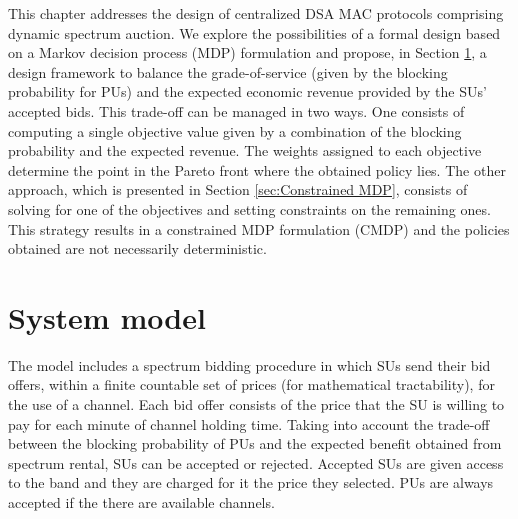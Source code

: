 This chapter addresses the design of centralized DSA MAC protocols comprising dynamic spectrum auction. We explore the possibilities of a formal design based on a Markov decision process (MDP) formulation and propose, in Section \ref{Sarnoff_sec_model}, a design framework to balance the grade-of-service (given by the blocking probability for PUs) and the expected economic revenue provided by the SUs' accepted bids. This trade-off can be managed in two ways. One consists of computing a single objective value given by a combination of the blocking probability and the expected revenue. The weights assigned to each objective determine the point in the Pareto front where the obtained policy lies. The other approach, which is presented in Section \ref{sec:Constrained MDP}, consists of solving for one of the objectives and setting constraints on the remaining ones.
This strategy results in a constrained MDP formulation (CMDP) and the policies obtained are not necessarily deterministic.

\section{System model}\label{Sarnoff_sec_model}

The model includes a spectrum bidding procedure in which SUs send their bid offers, within a finite countable set of prices (for mathematical tractability), for the use of a channel. Each bid offer consists of the price that the SU is willing to pay for each minute of channel holding time. Taking into account the trade-off between the blocking probability of PUs and the expected benefit obtained from spectrum rental, SUs can be accepted or rejected. Accepted SUs are given access to the band and they are charged for it the price they selected. PUs are always accepted if the there are available channels.

